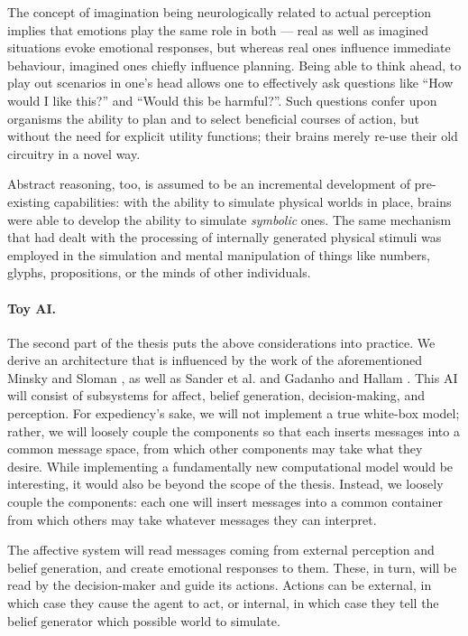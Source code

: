 The concept of imagination being neurologically related to actual perception implies that emotions play the same role in both --- real as well as imagined situations evoke emotional responses, but whereas real ones influence immediate behaviour, imagined ones chiefly influence planning. Being able to think ahead, to play out scenarios in one's head allows one to effectively ask questions like ``How would I like this?'' and ``Would this be harmful?''. Such questions confer upon organisms the ability to plan and to select beneficial courses of action, but without the need for explicit utility functions; their brains merely re-use their old circuitry in a novel way.

Abstract reasoning, too, is assumed to be an incremental development of pre-existing capabilities: with the ability to simulate physical worlds in place, brains were able to develop the ability to simulate {\em symbolic} ones. The same mechanism that had dealt with the processing of internally generated physical stimuli was employed in the simulation and mental manipulation of things like numbers, glyphs, propositions, or the minds of other individuals.

\paragraph{Toy AI.} The second part of the thesis puts the above considerations into practice. We derive an architecture that is influenced by the work of the aforementioned Minsky \cite{societyOfMind} and Sloman \cite{sloman1993,sloman1997}, as well as Sander et al. \cite{DBLP:journals/nn/SanderGS05} and Gadanho and Hallam \cite{DBLP:journals/adb/GadanhoH01}. This AI will consist of subsystems for affect, belief generation, decision-making, and perception. For expediency's sake, we will not implement a true white-box model; rather, we will loosely couple the components so that each inserts messages into a common message space, from which other components may take what they desire. While implementing a fundamentally new computational model would be interesting, it would also be beyond the scope of the thesis. Instead, we loosely couple the components: each one will insert messages into a common container from which others may take whatever messages they can interpret.

The affective system will read messages coming from external perception and belief generation, and create emotional responses to them. These, in turn, will be read by the decision-maker and guide its actions. Actions can be external, in which case they cause the agent to act, or internal, in which case they tell the belief generator which possible world to simulate.

